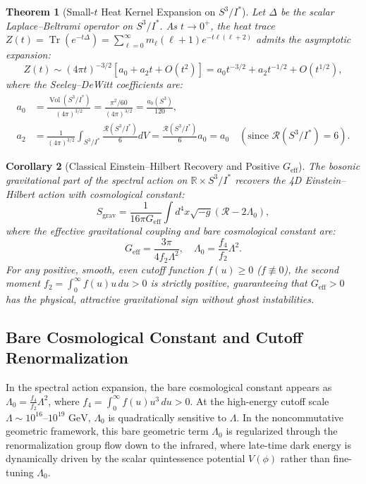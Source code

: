 \documentclass[11pt,a4paper]{article}
\newtheorem{theorem}{Theorem}[section]
\newtheorem{corollary}[theorem]{Corollary}
\theoremstyle{definition}
\newcommand{\R}{\mathbb{R}}
\newcommand{\Tr}{\operatorname{Tr}}
\newcommand{\vol}{\operatorname{Vol}}
\newcommand{\PDS}{S^3 / I^*}
\newcommand{\cR}{\mathcal{R}}
\begin{document}
\begin{theorem}[Small-$t$ Heat Kernel Expansion on $\PDS$]
\label{thm:heat_kernel}
Let $\Delta$ be the scalar Laplace--Beltrami operator on $\PDS$. As $t \to 0^+$, the heat trace $Z(t) = \Tr(e^{-t\Delta}) = \sum_{\ell=0}^\infty m_\ell (\ell+1) e^{-t\ell(\ell+2)}$ admits the asymptotic expansion:
\begin{equation}
    Z(t) \sim (4\pi t)^{-3/2} \left[ a_0 + a_2 t + O(t^2) \right] = a_0 t^{-3/2} + a_2 t^{-1/2} + O(t^{1/2}),
\end{equation}
where the Seeley--DeWitt coefficients are:
\begin{align}
    a_0 &= \frac{\vol(\PDS)}{(4\pi)^{3/2}} = \frac{\pi^2 / 60}{(4\pi)^{3/2}} = \frac{a_0(S^3)}{120}, \\
    a_2 &= \frac{1}{(4\pi)^{3/2}} \int_{\PDS} \frac{\cR(\PDS)}{6} dV = \frac{\cR(\PDS)}{6} a_0 = a_0 \quad (\text{since } \cR(\PDS) = 6).
\end{align}
\end{theorem}

\begin{corollary}[Classical Einstein--Hilbert Recovery and Positive $G_{\mathrm{eff}}$]
\label{cor:einstein_hilbert}
The bosonic gravitational part of the spectral action on $\R \times \PDS$ recovers the 4D Einstein--Hilbert action with cosmological constant:
\begin{equation}
    S_{\mathrm{grav}} = \frac{1}{16\pi G_{\mathrm{eff}}} \int d^4x \sqrt{-g} \left( \cR - 2\Lambda_0 \right),
\end{equation}
where the effective gravitational coupling and bare cosmological constant are:
\begin{equation}
    G_{\mathrm{eff}} = \frac{3\pi}{4 f_2 \Lambda^2}, \quad \Lambda_0 = \frac{f_4}{f_2} \Lambda^2.
\end{equation}
For any positive, smooth, even cutoff function $f(u) \ge 0$ ($f \not\equiv 0$), the second moment $f_2 = \int_0^\infty f(u) u \, du > 0$ is strictly positive, guaranteeing that $G_{\mathrm{eff}} > 0$ has the physical, attractive gravitational sign without ghost instabilities.
\end{corollary}

\subsection{Bare Cosmological Constant and Cutoff Renormalization}
In the spectral action expansion, the bare cosmological constant appears as $\Lambda_0 = \frac{f_4}{f_2}\Lambda^2$, where $f_4 = \int_0^\infty f(u) u^3 \, du > 0$. At the high-energy cutoff scale $\Lambda \sim 10^{16}\text{--}10^{19}\text{ GeV}$, $\Lambda_0$ is quadratically sensitive to $\Lambda$. In the noncommutative geometric framework, this bare geometric term $\Lambda_0$ is regularized through the renormalization group flow down to the infrared, where late-time dark energy is dynamically driven by the scalar quintessence potential $V(\phi)$ rather than fine-tuning $\Lambda_0$.
\end{document}
